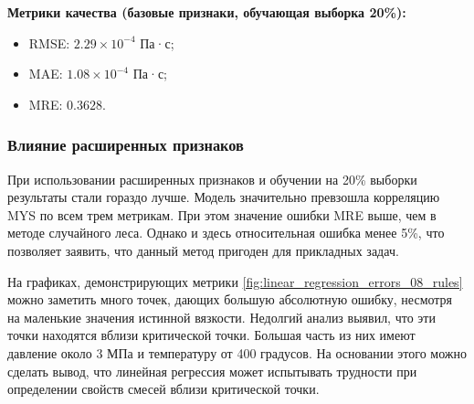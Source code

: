 \documentclass[a4paper,12pt]{article}
\begin{document}
    \begin{minipage}{\textwidth}
    \textbf{Метрики качества (базовые признаки, обучающая выборка 20\%):}
      \begin{itemize}
          \item RMSE: \( 2.29 \times 10^{-4} \) Па·с;
          \item MAE: \( 1.08 \times 10^{-4} \) Па·с;
          \item MRE: \( 0.3628 \).
      \end{itemize}
    \end{minipage}
    
    \subsubsection{Влияние расширенных признаков}
    
    При использовании расширенных признаков и обучении на 20\% выборки результаты стали гораздо лучше. Модель значительно превзошла корреляцию MYS по всем трем метрикам. При этом значение ошибки MRE выше, чем в методе случайного леса. Однако и здесь относительная ошибка менее 5\%, что позволяет заявить, что данный метод пригоден для прикладных задач. 

    На графиках, демонстрирующих метрики \autoref{fig:linear_regression_errors_08_rules} можно заметить много точек, дающих большую абсолютную ошибку, несмотря на маленькие значения истинной вязкости. Недолгий анализ выявил, что эти точки находятся вблизи критической точки. Большая часть из них имеют давление около 3 МПа и температуру от 400 градусов. На основании этого можно сделать вывод, что линейная регрессия может испытывать трудности при определении свойств смесей вблизи критической точки. 
    
\end{document}
